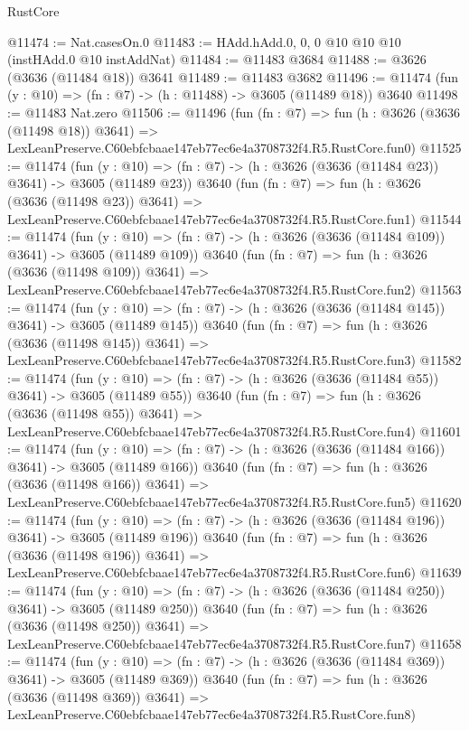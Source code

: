 \begin{lexlean}{RustCore}
\begin{coremodule}
@11474 := Nat.casesOn.{0}
@11483 := HAdd.hAdd.{0, 0, 0} @10 @10 @10 (instHAdd.{0} @10 instAddNat)
@11484 := @11483 @3684
@11488 := @3626 (@3636 (@11484 @18)) @3641
@11489 := @11483 @3682
@11496 := @11474 (fun (y : @10) => (fn : @7) -> (h : @11488) -> @3605 (@11489 @18)) @3640
@11498 := @11483 Nat.zero
@11506 := @11496
    (fun (fn : @7) =>
    fun (h : @3626 (@3636 (@11498 @18)) @3641) =>
    LexLeanPreserve.C60ebfcbaae147eb77ec6e4a3708732f4.R5.RustCore.fun0)
@11525 := @11474
    (fun (y : @10) => (fn : @7) -> (h : @3626 (@3636 (@11484 @23)) @3641) -> @3605 (@11489 @23))
    @3640
    (fun (fn : @7) =>
    fun (h : @3626 (@3636 (@11498 @23)) @3641) =>
    LexLeanPreserve.C60ebfcbaae147eb77ec6e4a3708732f4.R5.RustCore.fun1)
@11544 := @11474
    (fun (y : @10) => (fn : @7) -> (h : @3626 (@3636 (@11484 @109)) @3641) -> @3605 (@11489 @109))
    @3640
    (fun (fn : @7) =>
    fun (h : @3626 (@3636 (@11498 @109)) @3641) =>
    LexLeanPreserve.C60ebfcbaae147eb77ec6e4a3708732f4.R5.RustCore.fun2)
@11563 := @11474
    (fun (y : @10) => (fn : @7) -> (h : @3626 (@3636 (@11484 @145)) @3641) -> @3605 (@11489 @145))
    @3640
    (fun (fn : @7) =>
    fun (h : @3626 (@3636 (@11498 @145)) @3641) =>
    LexLeanPreserve.C60ebfcbaae147eb77ec6e4a3708732f4.R5.RustCore.fun3)
@11582 := @11474
    (fun (y : @10) => (fn : @7) -> (h : @3626 (@3636 (@11484 @55)) @3641) -> @3605 (@11489 @55))
    @3640
    (fun (fn : @7) =>
    fun (h : @3626 (@3636 (@11498 @55)) @3641) =>
    LexLeanPreserve.C60ebfcbaae147eb77ec6e4a3708732f4.R5.RustCore.fun4)
@11601 := @11474
    (fun (y : @10) => (fn : @7) -> (h : @3626 (@3636 (@11484 @166)) @3641) -> @3605 (@11489 @166))
    @3640
    (fun (fn : @7) =>
    fun (h : @3626 (@3636 (@11498 @166)) @3641) =>
    LexLeanPreserve.C60ebfcbaae147eb77ec6e4a3708732f4.R5.RustCore.fun5)
@11620 := @11474
    (fun (y : @10) => (fn : @7) -> (h : @3626 (@3636 (@11484 @196)) @3641) -> @3605 (@11489 @196))
    @3640
    (fun (fn : @7) =>
    fun (h : @3626 (@3636 (@11498 @196)) @3641) =>
    LexLeanPreserve.C60ebfcbaae147eb77ec6e4a3708732f4.R5.RustCore.fun6)
@11639 := @11474
    (fun (y : @10) => (fn : @7) -> (h : @3626 (@3636 (@11484 @250)) @3641) -> @3605 (@11489 @250))
    @3640
    (fun (fn : @7) =>
    fun (h : @3626 (@3636 (@11498 @250)) @3641) =>
    LexLeanPreserve.C60ebfcbaae147eb77ec6e4a3708732f4.R5.RustCore.fun7)
@11658 := @11474
    (fun (y : @10) => (fn : @7) -> (h : @3626 (@3636 (@11484 @369)) @3641) -> @3605 (@11489 @369))
    @3640
    (fun (fn : @7) =>
    fun (h : @3626 (@3636 (@11498 @369)) @3641) =>
    LexLeanPreserve.C60ebfcbaae147eb77ec6e4a3708732f4.R5.RustCore.fun8)

\end{coremodule}
\end{lexlean}
